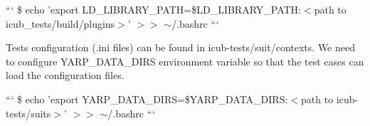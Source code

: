 ``` \$ echo 'export L\-D\-\_\-\-L\-I\-B\-R\-A\-R\-Y\-\_\-\-P\-A\-T\-H=\$\-L\-D\-\_\-\-L\-I\-B\-R\-A\-R\-Y\-\_\-\-P\-A\-T\-H\-:$<$path to icub\-\_\-tests/build/plugins$>$' $>$$>$ $\sim$/.bashrc ```

Tests configuration (.ini files) can be found in {\ttfamily icub-\/tests/suit/contexts}. We need to configure {\ttfamily Y\-A\-R\-P\-\_\-\-D\-A\-T\-A\-\_\-\-D\-I\-R\-S} environment variable so that the test cases can load the configuration files.

``` \$ echo 'export Y\-A\-R\-P\-\_\-\-D\-A\-T\-A\-\_\-\-D\-I\-R\-S=\$\-Y\-A\-R\-P\-\_\-\-D\-A\-T\-A\-\_\-\-D\-I\-R\-S\-:$<$path to icub-\/tests/suits$>$' $>$$>$ $\sim$/.bashrc ``` 